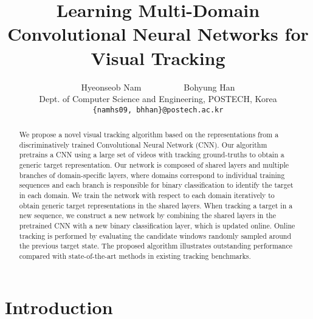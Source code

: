 \documentclass[10pt,twocolumn,letterpaper]{article}
\begin{document}
\title{Learning Multi-Domain Convolutional Neural Networks for Visual Tracking}

\author{Hyeonseob Nam~~~~~~~~~~Bohyung Han\\
Dept. of Computer Science and Engineering, POSTECH, Korea\\
{\tt\small \{namhs09, bhhan\}@postech.ac.kr}
}

\maketitle

\begin{abstract}
We propose a novel visual tracking algorithm based on the representations from a discriminatively trained Convolutional Neural Network (CNN). 
Our algorithm pretrains a CNN using a large set of videos with tracking ground-truths to obtain a generic target representation. 
Our network is composed of shared layers and multiple branches of domain-specific layers, where domains correspond to individual training sequences and each branch is responsible for binary classification to identify the target in each domain.
We train the network with respect to each domain iteratively to obtain generic target representations in the shared layers. 
When tracking a target in a new sequence, we construct a new network by combining the shared layers in the pretrained CNN with a new binary classification layer, which is updated online.
Online tracking is performed by evaluating the candidate windows randomly sampled around the previous target state. 
The proposed algorithm illustrates outstanding performance compared with state-of-the-art methods in existing tracking benchmarks.
\end{abstract}

\section{Introduction}
\end{document}
